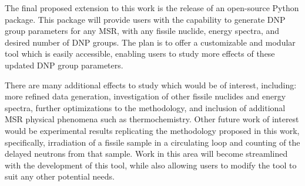 The final proposed extension to this work is the release of an open-source Python package.
This package will provide users with the capability to generate \gls{DNP} group parameters for any \gls{MSR}, with any fissile nuclide, energy spectra, and desired number of \gls{DNP} groups.
The plan is to offer a customizable and modular tool which is easily accessible, enabling users to study more effects of these updated \gls{DNP} group parameters.

There are many additional effects to study which would be of interest, including: more refined data generation, investigation of other fissile nuclides and energy spectra, further optimizations to the methodology, and inclusion of additional \gls{MSR} physical phenomena such as thermochemistry.
Other future work of interest would be experimental results replicating the methodology proposed in this work, specifically, irradiation of a fissile sample in a circulating loop and counting of the delayed neutrons from that sample.
Work in this area will become streamlined with the development of this tool, while also allowing users to modify the tool to suit any other potential needs.